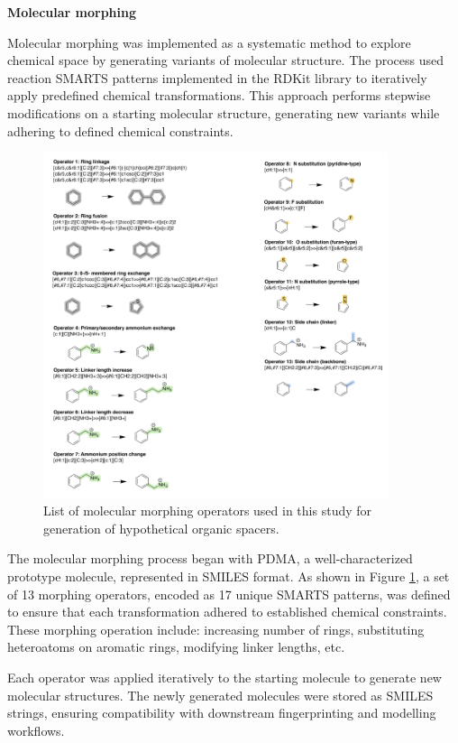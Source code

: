 \textbf{Molecular morphing}

Molecular morphing was implemented as a systematic method to explore chemical space by generating variants of molecular structure. The process used reaction SMARTS patterns implemented in the RDKit library to iteratively apply predefined chemical transformations. This approach performs stepwise modifications on a starting molecular structure, generating new variants while adhering to defined chemical constraints. 

\begin{figure}[ht]
    \centering
    \includegraphics[width=0.9\textwidth]{figures/methodology/figure3-9.png}
    \caption{List of molecular morphing operators used in this study for generation of hypothetical organic spacers.}
    \label{fig:figure3.8}
\end{figure}

The molecular morphing process began with  PDMA, a well-characterized prototype molecule, represented in SMILES format. As shown in Figure \ref{fig:figure3.8}, a set of 13 morphing operators, encoded as 17 unique SMARTS patterns, was defined to ensure that each transformation adhered to established chemical constraints. These morphing operation include:
increasing number of rings, substituting heteroatoms on aromatic rings, modifying linker lengths, etc.

Each operator was applied iteratively to the starting molecule to generate new molecular structures. The newly generated molecules were stored as SMILES strings, ensuring compatibility with downstream fingerprinting and modelling workflows.


